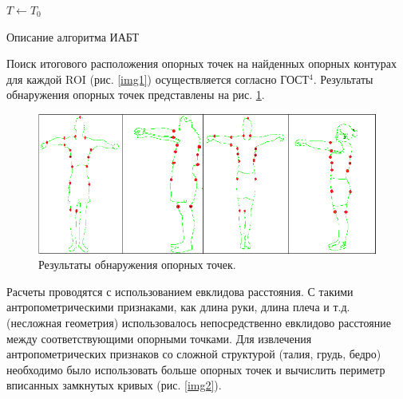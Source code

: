 \begin{algorithm}[ht!]
  $T\leftarrow T_0$\;
  \caption{Описание алгоритма ИАБТ}
\end{algorithm}

Поиск итогового расположения опорных точек на найденных опорных контурах для каждой ROI (рис. \ref{img1}) осуществляется согласно ГОСТ$^4$. Результаты обнаружения опорных точек представлены на рис. \ref{img7}.
\begin{figure}[ht!]
\centering
\includegraphics [width=0.9\linewidth] {images/h18.png}
\begin{center}
\caption{Результаты обнаружения опорных точек.} \label{img7}
\end{center}
\end{figure}
Расчеты проводятся с использованием евклидова расстояния. С такими антропометрическими признаками, как длина руки, длина плеча и т.д. (несложная геометрия) использовалось непосредственно евклидово расстояние между соответствующими опорными точками. Для извлечения антропометрических признаков со сложной структурой (талия, грудь, бедро) необходимо было использовать больше опорных точек и вычислить периметр вписанных замкнутых кривых (рис. \ref{img2}).

